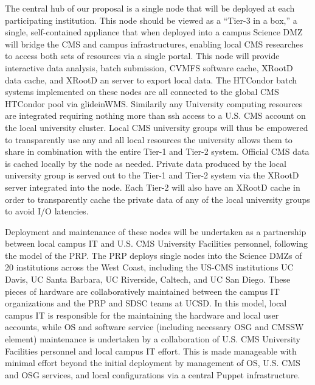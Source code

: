 \documentclass[11pt,a4paper]{article}
\begin{document}
The central hub of our proposal is a single node that will be deployed at
each participating institution.  This node should be viewed as a ``Tier-3
in a box,'' a single, self-contained appliance that when deployed into a
campus Science DMZ will bridge the CMS and campus infrastructures, enabling
local CMS researches to access both sets of resources via a single portal.
This node will provide interactive data analysis, batch submission, CVMFS
software cache, XRootD data cache, and XRootD an server to export local
data.  The HTCondor batch systems implemented on these nodes are all
connected to the global CMS HTCondor pool via glideinWMS.  Similarily any
University computing resources are integrated requiring nothing more than
ssh access to a U.S. CMS account on the local university cluster.  Local CMS
university groups will thus be empowered to transparently use any and all
local resources the university allows them to share in combination with the
entire Tier-1 and Tier-2 system. Official CMS data is cached locally by the
node as needed.  Private data produced by the local university group is
served out to the Tier-1 and Tier-2 system via the XRootD server integrated
into the node.  Each Tier-2 will also have an XRootD cache in order to
transparently cache the private data of any of the local university groups
to avoid I/O latencies.

Deployment and maintenance of these nodes will be undertaken as a
partnership between local campus IT and U.S. CMS University Facilities
personnel, following the model of the PRP.  The PRP deploys single nodes
into the Science DMZs of 20 institutions across the West Coast, including
the US-CMS institutions UC Davis, UC Santa Barbara, UC Riverside, Caltech,
and UC San Diego. These pieces of hardware are collaboratively maintained
between the campus IT organizations and the PRP and SDSC teams at UCSD.  In
this model, local campus IT is responsible for the maintaining the hardware
and local user accounts, while OS and software service (including necessary
OSG and CMSSW element) maintenance is undertaken by a collaboration of
U.S. CMS University Facilities personnel and local campus IT effort.  This is made
manageable with minimal effort beyond the initial deployment by management
of OS, U.S. CMS and OSG services, and local configurations via a central
Puppet infrastructure.
\end{document}
